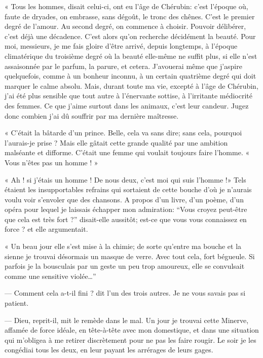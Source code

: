 « Tous les hommes, disait celui{}-ci, ont eu l’âge de
Chérubin: c’est l’époque où, faute de
dryades, on embrasse, sans dégoût, le tronc des chênes.
C’est le premier degré de l’amour. Au
second degré, on commence à choisir. Pouvoir délibérer,
c’est déjà une décadence. C’est alors
qu’on recherche décidément la beauté. Pour moi,
messieurs, je me fais gloire d’être arrivé, depuis
longtemps, à l’époque climatérique du troisième degré
où la beauté elle{}-même ne suffit plus, si elle n’est
assaisonnée par le parfum, la parure, et cetera.
J’avouerai même que j’aspire
quelquefois, comme à un bonheur inconnu, à un certain quatrième degré
qui doit marquer le calme absolu. Mais, durant toute ma vie, excepté à
l’âge de Chérubin, j’ai été plus
sensible que tout autre à l’énervante sottise, à
l’irritante médiocrité des femmes. Ce que
j’aime surtout dans les animaux,
c’est leur candeur. Jugez donc combien
j’ai dû souffrir par ma dernière maîtresse.

 « C’était la bâtarde d’un prince.
Belle, cela va sans dire; sans cela, pourquoi
l’aurais{}-je prise ? Mais elle gâtait cette grande
qualité par une ambition malséante et difforme.
C’était une femme qui voulait toujours faire
l’homme. « Vous n’êtes pas un homme !
»

« Ah ! si j’étais un homme ! De nous deux,
c’est moi qui suis l’homme !» Tels
étaient les insupportables refrains qui sortaient de cette bouche
d’où je n’aurais voulu voir
s’envoler que des chansons. A propos
d’un livre, d’un poème,
d’un opéra pour lequel je laissais échapper mon
admiration: ``Vous croyez peut{}-être que cela est
très fort ?'' disait{}-elle aussitôt; est{}-ce que vous vous connaissez
en force ? et elle argumentait.

« Un beau jour elle s’est mise à la chimie; de sorte
qu’entre ma bouche et la sienne je trouvai désormais
un masque de verre. Avec tout cela, fort bégueule. Si parfois je la
bousculais par un geste un peu trop amoureux, elle se convulsait comme
une sensitive violée\ldots''

--- Comment cela a{}-t{}-il fini ? dit l’un des trois
autres. Je ne vous savais pas si patient.

--- Dieu, reprit{}-il, mit le remède dans le mal. Un jour je trouvai cette
Minerve, affamée de force idéale, en tête{}-à{}-tête avec mon
domestique, et dans une situation qui m’obligea à me
retirer discrètement pour ne pas les faire rougir. Le soir je les
congédiai tous les deux, en leur payant les arrérages de leurs gages.

